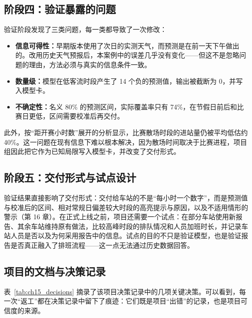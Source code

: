 \subsection*{阶段四：验证暴露的问题}

验证阶段发现了三类问题，每一类都导致了一次修改：

\begin{itemize}
  \item \textbf{信息可得性：}早期版本使用了次日的实测天气，而预测是在前一天下午做出的。改用历史天气预报后，本案例中的误差几乎没有变化——但这不是忽略问题的理由，方法必须与真实的信息条件一致。
  \item \textbf{数量级：}模型在低客流时段产生了 14 个负的预测值，输出被截断为 0，并写入模型卡。
  \item \textbf{不确定性：}名义 80\% 的预测区间，实际覆盖率只有 74\%，在节假日前后和比赛日更低，区间需要校准后再交付。
\end{itemize}

此外，按“距开赛小时数”展开的分析显示，比赛散场时段的进站量仍被平均低估约 40\%。这一问题在现有信息下难以根本解决，因为散场时间取决于比赛进程，项目组因此把它作为已知局限写入模型卡，并改变了交付形式。

\subsection*{阶段五：交付形式与试点设计}

验证结果直接影响了交付形式：交付给车站的不是“每小时一个数字”，而是预测值与校准后的区间、相对常规日偏差较大时段的高亮提示与原因，以及不适用情形的警示（第 16 章）。在正式上线之前，项目还需要一个试点：在部分车站使用新报告、其余车站维持原有做法，比较高峰时段的排队情况和人员加班时长，并记录车站人员是否以及为何采用报告中的信息。试点的目的不只是验证模型，也是验证报告是否真正融入了排班流程——这一点无法通过历史数据回答。

\subsection*{项目的文档与决策记录}

表~\ref{tab:ch15_decisions} 摘录了该项目决策记录中的几项关键决策。可以看到，每一次“返工”都在决策记录中留下了痕迹：它们既是项目“出错”的记录，也是项目可信度的来源。

